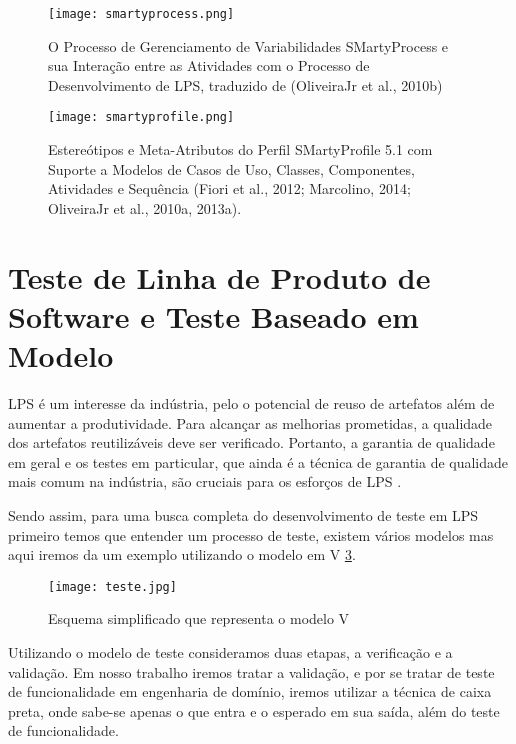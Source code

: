 \begin{figure}[htb]
	\centering
	\texttt{[image: smartyprocess.png]}
	\caption{ O Processo de Gerenciamento de Variabilidades SMartyProcess e sua
		Interação entre as Atividades com o Processo de Desenvolvimento de LPS,
		traduzido de (OliveiraJr et al., 2010b)}
	\label{fig:smartyprocess}
\end{figure}

\newpage
\begin{landscape}

\begin{figure}[htb]
	\centering
	\texttt{[image: smartyprofile.png]}
	\caption{ Estereótipos e Meta-Atributos do Perfil SMartyProfile 5.1 com Suporte a Modelos de Casos de Uso, Classes, Componentes, Atividades e Sequência (Fiori et al., 2012; Marcolino, 2014; OliveiraJr et al., 2010a, 2013a). }
	\label{fig:smartyprofile}
\end{figure}


\end{landscape}

\section{Teste de Linha de Produto de Software e Teste Baseado em Modelo}
\label{sec:conc}
LPS é um interesse da indústria, pelo o potencial de reuso de artefatos além de aumentar a produtividade. Para alcançar as melhorias prometidas, a qualidade dos artefatos reutilizáveis deve ser verificado. Portanto, a garantia de qualidade em geral e os testes em particular, que ainda é a técnica de garantia de qualidade mais comum na indústria, são cruciais para os esforços de LPS \cite{delamaro2017introduccao}.

Sendo assim, para uma busca completa do desenvolvimento de teste em LPS primeiro temos que entender um processo de teste, existem vários modelos mas aqui iremos da um exemplo utilizando o modelo em V \ref{fig:teste}.

\begin{figure}[htb]
	\centering
	\texttt{[image: teste.jpg]}
	\caption{ Esquema simplificado que representa o modelo V }
	\label{fig:teste}
\end{figure}

Utilizando o modelo de teste consideramos duas etapas, a verificação e a validação. Em nosso trabalho iremos tratar a validação, e por se tratar de teste de funcionalidade em engenharia de domínio, iremos utilizar a técnica de caixa preta, onde sabe-se apenas o que entra e o esperado em sua saída, além do teste de funcionalidade.

